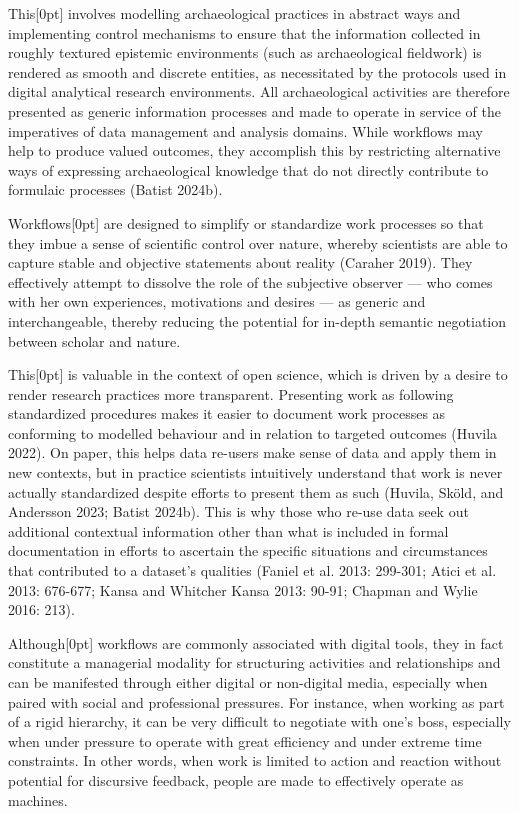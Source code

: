 \documentclass[
]{article}
\newcommand{\paragraphnumber}[1]{\marginnote{\color{lightgray}\tiny{#1}}[0pt]}
\begin{document}
This\paragraphnumber{[15]} involves modelling archaeological practices
in abstract ways and implementing control mechanisms to ensure that the
information collected in roughly textured epistemic environments (such
as archaeological fieldwork) is rendered as smooth and discrete
entities, as necessitated by the protocols used in digital analytical
research environments. All archaeological activities are therefore
presented as generic information processes and made to operate in
service of the imperatives of data management and analysis domains.
While workflows may help to produce valued outcomes, they accomplish
this by restricting alternative ways of expressing archaeological
knowledge that do not directly contribute to formulaic processes (Batist
2024b).

Workflows\paragraphnumber{[16]} are designed to simplify or standardize
work processes so that they imbue a sense of scientific control over
nature, whereby scientists are able to capture stable and objective
statements about reality (Caraher 2019). They effectively attempt to
dissolve the role of the subjective observer --- who comes with her own
experiences, motivations and desires --- as generic and interchangeable,
thereby reducing the potential for in-depth semantic negotiation between
scholar and nature.

This\paragraphnumber{[17]} is valuable in the context of open science,
which is driven by a desire to render research practices more
transparent. Presenting work as following standardized procedures makes
it easier to document work processes as conforming to modelled behaviour
and in relation to targeted outcomes (Huvila 2022). On paper, this helps
data re-users make sense of data and apply them in new contexts, but in
practice scientists intuitively understand that work is never actually
standardized despite efforts to present them as such (Huvila, Sköld, and
Andersson 2023; Batist 2024b). This is why those who re-use data seek
out additional contextual information other than what is included in
formal documentation in efforts to ascertain the specific situations and
circumstances that contributed to a dataset's qualities (Faniel et al.
2013: 299-301; Atici et al. 2013: 676-677; Kansa and Whitcher Kansa
2013: 90-91; Chapman and Wylie 2016: 213).

Although\paragraphnumber{[18]} workflows are commonly associated with
digital tools, they in fact constitute a managerial modality for
structuring activities and relationships and can be manifested through
either digital or non-digital media, especially when paired with social
and professional pressures. For instance, when working as part of a
rigid hierarchy, it can be very difficult to negotiate with one's boss,
especially when under pressure to operate with great efficiency and
under extreme time constraints. In other words, when work is limited to
action and reaction without potential for discursive feedback, people
are made to effectively operate as machines.
\end{document}
